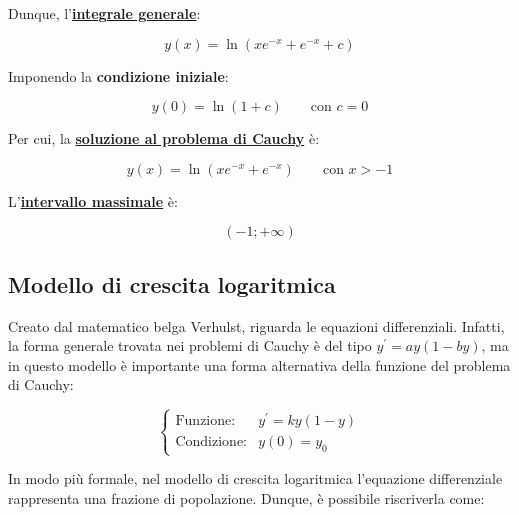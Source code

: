\documentclass[a4paper]{article}
\begin{document}
	\noindent
	Dunque, l'\textbf{\underline{integrale generale}}:
	
	\begin{equation*}
		y\left(x\right) = \ln \left(x e^{-x} + e^{-x} + c\right)
	\end{equation*}

	\noindent
	Imponendo la \textbf{condizione iniziale}:
	
	\begin{equation*}
		y\left(0\right) = \ln \left(1+c\right) \hspace{2em} \text{con } c = 0
	\end{equation*}

	\noindent
	Per cui, la \textbf{\underline{soluzione al problema di Cauchy}} è:
	
	\begin{equation*}
		y\left(x\right) = \ln\left(x e^{-x} + e^{-x}\right) \hspace{2em} \text{con } x > -1
	\end{equation*}

	\noindent
	L'\textbf{\underline{intervallo massimale}} è:
	
	\begin{equation*}
		\left(-1; +\infty\right)
	\end{equation*}

	\newpage
	
	\subsection{Modello di crescita logaritmica}
	
	Creato dal matematico belga Verhulst, riguarda le equazioni differenziali. Infatti, la forma generale trovata nei problemi di Cauchy è del tipo $y^{'} = a y \left(1 - by\right)$, ma in questo modello è importante una forma alternativa della funzione del problema di Cauchy:
	
	\begin{equation*}
		\begin{cases}
			\text{Funzione:} & y^{'} = k y \left(1 - y\right) \\
			\text{Condizione:} & y\left(0\right) = y_{0}
		\end{cases}
	\end{equation*}

	\noindent
	In modo più formale, nel modello di crescita logaritmica l'equazione differenziale rappresenta una frazione di popolazione. Dunque, è possibile riscriverla come:
	
\end{document}
